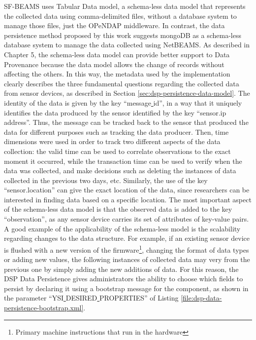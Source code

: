 SF-BEAMS uses Tabular Data model, a schema-less data model that represents the
collected data using comma-delimited files, without a database system to manage
those files, just the OPeNDAP middleware. In contrast, the data persistence
method proposed by this work suggests mongoDB as a schema-less database system
to manage the data collected using NetBEAMS. As described in Chapter 5, the
schema-less data model can provide better support to Data Provenance because
the data model allows the change of records without affecting the
others. In this way, the metadata used by the implementation clearly describes
the three fundamental questions regarding the collected data from sensor
devices, as described in Section \ref{sec:dsp-persistence-data-model}. The 
identity of the data is given by the key ``message\underline{ }id'', in a way
that it uniquely identifies the data produced by the sensor identified by the
key ``sensor.ip\underline{ }address''. Thus, the message can be tracked
back to the sensor that produced the data for different purposes such as
tracking the data producer. Then, time dimensions were used in order to
track two different aspects of the data collection: the valid time can be used
to correlate observations to the exact moment it occurred, while the
transaction time can be used to verify when the data was collected, and make
decisions such as deleting the instances of data collected in the previous two
days, etc. Similarly, the use of the key ``sensor.location'' can give the exact
location of the data, since researchers can be interested in finding data
based on a specific location. The most important aspect of the schema-less data
model is that the observed data is added to the key ``observation'', as any
sensor device carries its set of attributes of key-value pairs. A good example
of the applicability of the schema-less model is the scalability regarding
changes to the data structure. For example, if an existing sensor device is
flushed with a new version of the firmware\footnote{Primary machine
instructions that run in the hardware}, changing the format of data types or
adding new values, the following instances of collected data may very
from the previous one by simply adding the new additions of data. For this
reason, the DSP Data Persistence gives administrators the ability to choose
which fields to persist by declaring it using a bootstrap message for the
component, as shown in the parameter ``YSI\underline{ }DESIRED\underline{
}PROPERTIES'' of Listing \ref{file:dsp-data-persistence-bootstrap.xml}.

